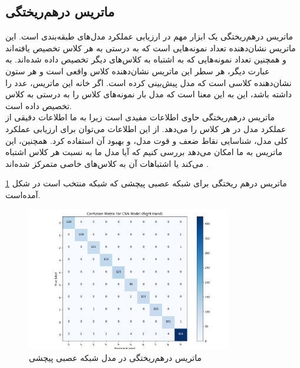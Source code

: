 

\subsection[ماتریس درهم‌ریختگی]{ماتریس درهم‌ریختگی\protect{}}
ماتریس درهم‌ریختگی یک ابزار مهم در ارزیابی عملکرد مدل‌های طبقه‌بندی است. این ماتریس نشان‌دهنده تعداد نمونه‌هایی است که به درستی به هر کلاس تخصیص یافته‌اند و همچنین تعداد نمونه‌هایی که به اشتباه به کلاس‌های دیگر تخصیص داده شده‌اند. به عبارت دیگر، هر سطر این ماتریس نشان‌دهنده کلاس واقعی است و هر ستون نشان‌دهنده کلاسی است که مدل پیش‌بینی کرده است. اگر خانه  این ماتریس، عدد  را داشته باشد، این به این معنا است که مدل  بار نمونه‌های کلاس  را به درستی به کلاس  تخصیص داده است.
\\
ماتریس درهم‌ریختگی حاوی اطلاعات مفیدی است زیرا به ما اطلاعات دقیقی از عملکرد مدل در هر کلاس را می‌دهد. از این اطلاعات می‌توان برای ارزیابی عملکرد کلی مدل، شناسایی نقاط ضعف و قوت مدل، و بهبود آن استفاده کرد. همچنین، این ماتریس به ما امکان می‌دهد بررسی کنیم که آیا مدل ما به نسبت هر کلاس اشتباه می‌کند یا اشتباهات آن به کلاس‌های خاصی متمرکز شده‌اند \cite{Confusio72:online}.

ماتریس درهم ریختگی برای شبکه عصبی پیچشی که شبکه منتخب است در شکل \ref{matrix} آمده‌است.



\begin{figure}[h]
    \centering
    \includegraphics[width=0.8\textwidth]{Matrix_CNN_right.png}
    \caption{ ماتریس درهم‌ریختگی در مدل شبکه عصبی پیچشی}
    \label{matrix}
\end{figure}


